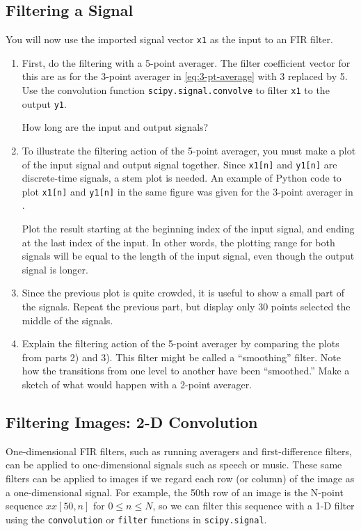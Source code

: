 \subsection{Filtering a Signal}
You will now use the imported signal vector \verb|x1| as the input to an FIR filter.
\begin{enumerate}[1)]
\item First, do the filtering with a 5-point averager. The filter coefficient vector for this are as for the 3-point averager in \eqref{eq:3-pt-average} with 3 replaced by 5.
	Use the convolution function \verb|scipy.signal.convolve| to filter \verb|x1| to the output  \verb|y1|. 
	
	How long are the input and output signals?

\item To illustrate the filtering action of the 5-point averager, you must make a plot of the input signal and output signal together. 
	Since \verb|x1[n]| and \verb|y1[n]| are discrete-time signals, a stem plot is needed. 
	An example of Python code to plot \verb|x1[n]| and \verb|y1[n]| in the same figure was given for the 3-point averager in .

	Plot the result starting at the beginning index of the input signal, and ending at the last index of the input. In other 	words, the plotting range for both signals will be equal to the length of the input signal, even though the output signal is longer.
	
\item Since the previous plot is quite crowded, it is useful to show a small part of the signals. Repeat the previous part, but display only 30 points selected the middle of the signals.
	
	\item Explain the filtering action of the 5-point averager by comparing the plots from parts 2) and 3). 
	This filter might be called a “smoothing” filter. Note how the transitions from one level to another have been “smoothed.” 
	Make a sketch of what would happen with a 2-point averager.
\end{enumerate}

\subsection{Filtering Images: 2-D Convolution}
One-dimensional FIR filters, such as running averagers and first-difference filters, can be applied to one-dimensional signals such as speech or music. These same filters can be applied to images if we regard each row (or column) of the image as a one-dimensional signal. For example, the 50th row of an image is the
N-point sequence $xx[50,n]$ for $0 \le n \le N$, so we can filter this sequence with a 1-D filter using the \verb|convolution| or \verb|filter| functions in \verb|scipy.signal|.

